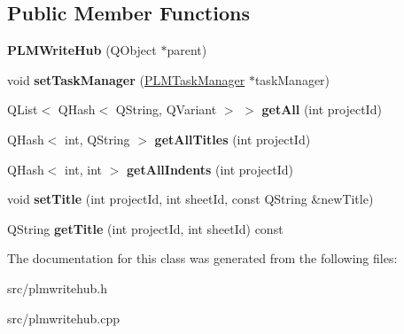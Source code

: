 \subsection*{Public Member Functions}
\begin{DoxyCompactItemize}
\item 
{\bfseries P\+L\+M\+Write\+Hub} (Q\+Object $\ast$parent)\hypertarget{class_p_l_m_write_hub_a554c1cae8c88cf6d645e5dec45bc9593}{}\label{class_p_l_m_write_hub_a554c1cae8c88cf6d645e5dec45bc9593}

\item 
void {\bfseries set\+Task\+Manager} (\hyperlink{class_p_l_m_task_manager}{P\+L\+M\+Task\+Manager} $\ast$task\+Manager)\hypertarget{class_p_l_m_write_hub_a8a67899963a087425b8ac703f501d665}{}\label{class_p_l_m_write_hub_a8a67899963a087425b8ac703f501d665}

\item 
Q\+List$<$ Q\+Hash$<$ Q\+String, Q\+Variant $>$ $>$ {\bfseries get\+All} (int project\+Id)\hypertarget{class_p_l_m_write_hub_a52e5b635cd12f7b6a1aba8ce2f17d64e}{}\label{class_p_l_m_write_hub_a52e5b635cd12f7b6a1aba8ce2f17d64e}

\item 
Q\+Hash$<$ int, Q\+String $>$ {\bfseries get\+All\+Titles} (int project\+Id)\hypertarget{class_p_l_m_write_hub_afde87d06c896386b118d825405ebc692}{}\label{class_p_l_m_write_hub_afde87d06c896386b118d825405ebc692}

\item 
Q\+Hash$<$ int, int $>$ {\bfseries get\+All\+Indents} (int project\+Id)\hypertarget{class_p_l_m_write_hub_a3782f562e8eded569d90c0f531f42623}{}\label{class_p_l_m_write_hub_a3782f562e8eded569d90c0f531f42623}

\item 
void {\bfseries set\+Title} (int project\+Id, int sheet\+Id, const Q\+String \&new\+Title)\hypertarget{class_p_l_m_write_hub_a0f1c5e06d781c041c599d9efd978e024}{}\label{class_p_l_m_write_hub_a0f1c5e06d781c041c599d9efd978e024}

\item 
Q\+String {\bfseries get\+Title} (int project\+Id, int sheet\+Id) const \hypertarget{class_p_l_m_write_hub_af3058a0251b7c4b667ad3db1701157aa}{}\label{class_p_l_m_write_hub_af3058a0251b7c4b667ad3db1701157aa}

\end{DoxyCompactItemize}


The documentation for this class was generated from the following files\+:\begin{DoxyCompactItemize}
\item 
src/plmwritehub.\+h\item 
src/plmwritehub.\+cpp\end{DoxyCompactItemize}
